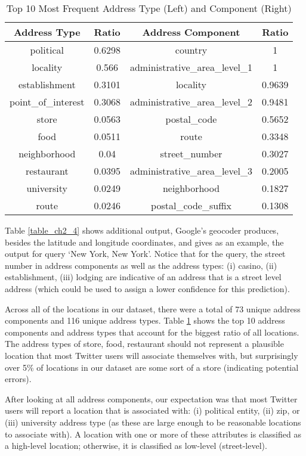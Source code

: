 \begin{table}
\small
\renewcommand{\arraystretch}{1.2}
\caption[Top 10 Most Frequent Address Type and Address Component]{Top 10 Most Frequent Address Type (Left) and Component (Right)}
\label{table_ch2_6}
\centering
\begin{tabular}{|c|c||c|c|}
\hline
\bfseries Address Type & \bfseries Ratio & \bfseries Address Component & \bfseries Ratio \\
\hline
political&0.6298&country&1\\
\hline
locality&0.566&administrative\_area\_level\_1&1\\
\hline
establishment&0.3101&locality&0.9639\\
\hline
point\_of\_interest&0.3068&administrative\_area\_level\_2&0.9481\\
\hline
store&0.0563&postal\_code&0.5652\\
\hline
food&0.0511&route&0.3348\\
\hline
neighborhood&0.04&street\_number&0.3027\\
\hline
restaurant&0.0395&administrative\_area\_level\_3&0.2005\\
\hline
university&0.0249&neighborhood&0.1827\\
\hline
route&0.0246&postal\_code\_suffix&0.1308\\
\hline
\end{tabular}
\end{table}

Table \ref{table_ch2_4} shows additional output, Google's geocoder produces, besides the latitude and longitude coordinates, and gives as an example, the output for query `New York, New York'. Notice that for the query, the street number in address components as well as the address types: (i) casino, (ii) establishment, (iii) lodging are indicative of an address that is a street level address (which could be used to assign a lower confidence for this prediction).

Across all of the locations in our dataset, there were a total of 73 unique address components and 116 unique address types. Table \ref{table_ch2_6} shows the top 10 address components and address types that account for the biggest ratio of all locations. The address types of store, food, restaurant should not represent a plausible location that most Twitter users will associate themselves with, but surprisingly over 5\% of locations in our dataset are some sort of a store (indicating potential errors). 

After looking at all address components, our expectation was that most Twitter users will report a location that is associated with: (i) political entity, (ii) zip, or (iii) university address type (as these are large enough to be reasonable locations to associate with). A location with one or more of these attributes is classified as a high-level location; otherwise, it is classified as low-level (street-level). 

